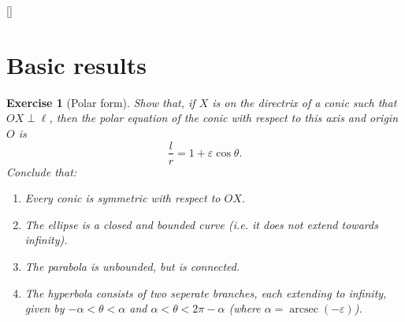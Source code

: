 \documentclass[a4paper,leqno,10pt]{article}
\theoremstyle{exercise}
\newtheorem{Exercise}{Exercise}
\newenvironment{exercise}
  {\begin{mdframed}\begin{Exercise}}
  {\end{Exercise}\end{mdframed}}
\theoremstyle{plain}
\theoremstyle{definition}
\theoremstyle{remark}
\DeclareMathOperator{\arcsec}{arcsec}
\begin{document}
[{\titlerule[0.8pt]}]
\let\oldsection\section
\renewcommand\section{\clearpage\oldsection}
\setcounter{section}{2}\addtocounter{section}{-1}
\section{Basic results}

\begin{exercise}[Polar form]
  Show that, if $ X $ is on the directrix of a conic such that $ OX \perp \ell $, then the polar equation of the
  conic with respect to this axis and origin $ O $ is
  \begin{displaymath}
    \frac{l}{r} = 1 + \varepsilon \cos \theta.
  \end{displaymath}
  Conclude that:
  \begin{enumerate}
    \item Every conic is symmetric with respect to $ OX $.
    \item The ellipse is a closed and bounded curve (i.e. it does not extend towards infinity).
    \item The parabola is unbounded, but is connected.
    \item The hyperbola consists of two seperate branches, each extending to infinity, given by $ -\alpha < \theta < \alpha $
          and $ \alpha < \theta < 2\pi - \alpha $ (where $ \alpha = \arcsec(-\varepsilon) $).
  \end{enumerate}
\end{exercise}
\end{document}
